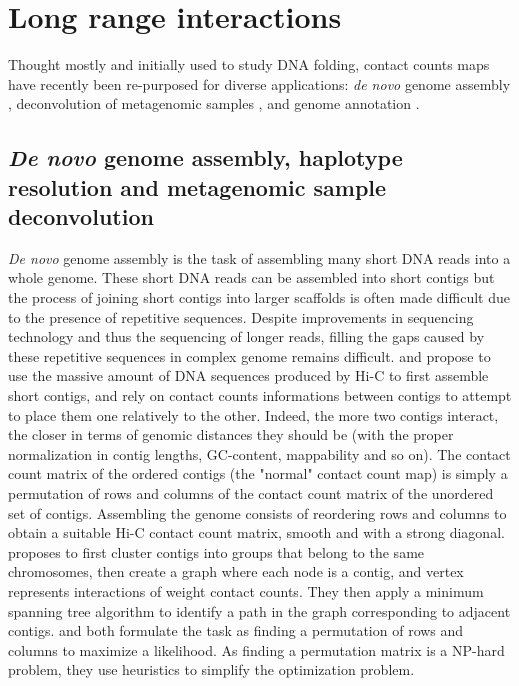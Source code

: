 \section{Long range interactions}


Thought mostly and initially used to study DNA folding, contact counts maps
have recently been re-purposed for diverse applications: \textit{de novo}
genome assembly \citep{burton:chromosome, kaplan:high-throughput},
deconvolution of metagenomic samples \citep{burton:species-level,
beitel:strain}, and genome annotation \citep{marie-nelly:filling,
varoquaux:accurate}.

\subsection{\textit{De novo} genome assembly, haplotype resolution and
metagenomic sample deconvolution}

\textit{De novo} genome assembly is the task of assembling many short DNA
reads into a whole genome. These short DNA reads can be assembled into short
contigs but the process of joining short contigs into larger scaffolds is
often made difficult due to the presence of repetitive sequences. Despite
improvements in sequencing technology and thus the sequencing of longer reads,
filling the gaps caused by these repetitive sequences in complex genome
remains difficult. \citet{burton:chromosome} and
\citet{kaplan:high-throughput} propose to use the massive amount of DNA
sequences produced by Hi-C to first assemble short contigs, and rely on
contact counts informations between contigs to attempt to place them one
relatively to the other. Indeed, the more two contigs interact, the closer in
terms of genomic distances they should be (with the proper normalization in
contig lengths, GC-content, mappability and so on). The contact count matrix
of the ordered contigs (the "normal" contact count map) is simply a
permutation of rows and columns of the contact count matrix of the unordered
set of contigs. Assembling the genome consists of reordering rows and
columns to obtain a suitable Hi-C contact count matrix, smooth and with a
strong diagonal. \citet{burton:chromosome} proposes to first cluster contigs
into groups that belong to the same chromosomes, then create a graph where
each node is a contig, and vertex represents interactions of weight contact
counts. They then apply a minimum spanning tree algorithm to identify a path
in the graph corresponding to adjacent contigs. \citet{kaplan:high-throughput}
and \citet{marie-nelly:high-quality} both formulate the task as finding a
permutation of rows and columns to maximize a likelihood. As finding a
permutation matrix is a NP-hard problem, they use heuristics to simplify the
optimization problem.

